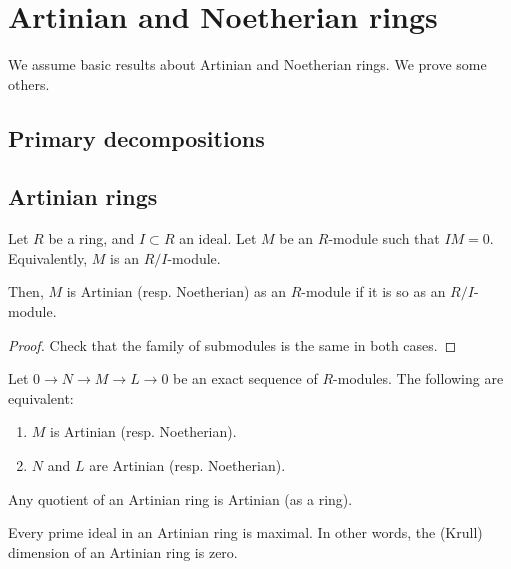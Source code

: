 \documentclass[12pt]{article}
\begin{document}
\coverpage
\thispagestyle{empty}
\updated{\today}
\thispagestyle{empty}
\tableofcontents
\pagestyle{fancy}
\setcounter{page}{1}

\section{Artinian and Noetherian rings}

We assume basic results about Artinian and Noetherian rings. We prove some others.

\subsection{Primary decompositions}

\subsection{Artinian rings}

\begin{prop}
	Let $R$ be a ring, and $I \subset R$ an ideal. Let $M$ be an $R$-module such that $IM = 0$. Equivalently, $M$ is an $R/I$-module.

	Then, $M$ is Artinian (resp. Noetherian) as an $R$-module if it is so as an $R/I$-module.
\end{prop}
\begin{proof} 
	Check that the family of submodules is the same in both cases.
\end{proof}

\begin{prop} \label{prop:artinian-noetherian-two-of-three}
	Let $0 \to N \to M \to L \to 0$ be an exact sequence of $R$-modules. The following are equivalent:
	\begin{enumerate}
		\item $M$ is Artinian (resp. Noetherian).
		\item $N$ and $L$ are Artinian (resp. Noetherian).
	\end{enumerate}
\end{prop}

\begin{cor}
	Any quotient of an Artinian ring is Artinian (as a ring).
\end{cor}

\begin{cor} \label{cor:artin-primes-maximal}
	Every prime ideal in an Artinian ring is maximal. In other words, the (Krull) dimension of an Artinian ring is zero.
\end{cor}
\end{document}
